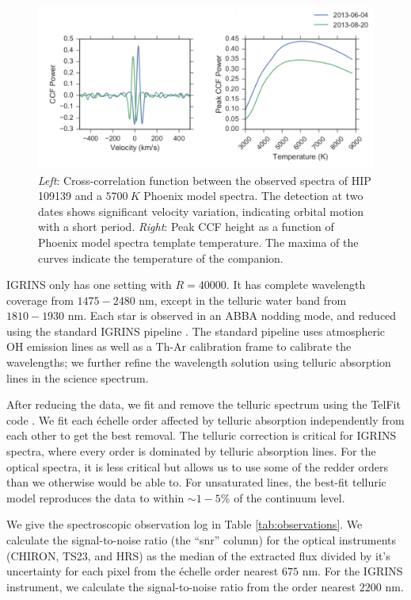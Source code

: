 \documentclass{emulateapj}
\begin{document}
\begin{figure}
\includegraphics[width=\textwidth]{HIP_109139.pdf}
\caption{\emph{Left}: Cross-correlation function between the observed spectra of HIP 109139 and a $5700\ K$ Phoenix model spectra. The detection at two dates shows significant velocity variation, indicating orbital motion with a short period. \emph{Right}: Peak CCF height as a function of Phoenix model spectra template temperature. The maxima of the curves indicate the temperature of the companion.}
\label{fig:ccf}
\end{figure}

IGRINS only has one setting with $R = 40000$. It has complete wavelength coverage from $1475-2480$ nm, except in the telluric water band from $1810 - 1930$ nm. Each star is observed in an ABBA nodding mode, and reduced using the standard IGRINS pipeline \citep{IGRINS_plp_v2}. The standard pipeline uses atmospheric OH emission lines as well as a Th-Ar calibration frame to calibrate the wavelengths; we further refine the wavelength solution using telluric absorption lines in the science spectrum.

After reducing the data, we fit and remove the telluric spectrum using the TelFit code \citep{Gullikson2014}. We fit each \'echelle order affected by telluric absorption independently from each other to get the best removal. The telluric correction is critical for IGRINS spectra, where every order is dominated by telluric absorption lines. For the optical spectra, it is less critical but allows us to use some of the redder orders than we otherwise would be able to. For unsaturated lines, the best-fit telluric model reproduces the data to within $\sim 1-5\%$ of the continuum level.

We give the spectroscopic observation log in Table \ref{tab:observations}. We calculate the signal-to-noise ratio (the ``snr'' column) for the optical instruments (CHIRON, TS23, and HRS) as the median of the extracted flux divided by it's uncertainty for each pixel from the \'echelle order nearest $675$ nm. For the IGRINS instrument, we calculate the signal-to-noise ratio from the order nearest $2200$ nm.
\end{document}
